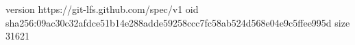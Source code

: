 version https://git-lfs.github.com/spec/v1
oid sha256:09ac30c32afdce51b14e288adde59258ccc7fc58ab524d568e04e9c5ffee995d
size 31621
